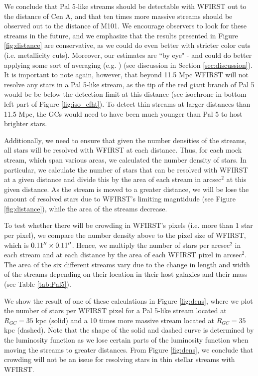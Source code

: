 \documentclass[twocolumn]{aastex62}
\begin{document}
We conclude that Pal 5-like streams should be detectable with WFIRST out to the distance of Cen A, and that ten times more massive streams should be observed out to the distance of M101. We encourage observers to look for these streams in the future, and we emphasize that the results presented in Figure \ref{fig:distance} are conservative, as we could do even better with stricter color cuts (i.e. metallicity cuts). Moreover, our estimates are ``by eye" - and could do better applying some sort of averaging (e.g. \citealt{malhan18}) (see discussion in Section \ref{sec:discussion}). It is important to note again, however, that beyond 11.5 Mpc WFIRST will not resolve any stars in a Pal 5-like stream, as the tip of the red giant branch of Pal 5 would be be below the detection limit at this distance (see isochrone in bottom left part of Figure \ref{fig:iso_cfht}). To detect thin streams at larger distances than 11.5 Mpc, the GCs would need to have been much younger than Pal 5 to host brighter stars. 

Additionally, we need to ensure that given the number densities of the streams, all stars will be resolved with WFIRST at each distance. Thus, for each mock stream, which span various areas, we calculated the number density of stars. In particular, we calculate the number of stars that can be resolved with WFIRST at a given distance and divide this by the area of each stream in arcsec$^2$ at this given distance. As the stream is moved to a greater distance, we will be lose the amount of resolved stars due to WFIRST's limiting magntidude (see Figure \ref{fig:distance}), while the area of the streams decrease. 

To test whether there will be crowding in WFIRST's pixels (i.e. more than 1 star per pixel), we compare the number density above to the pixel size of WFIRST, which is $0.11\mbox{$^{\prime\prime}$} \times 0.11\mbox{$^{\prime\prime}$}$. Hence, we multiply the number of stars per arcsec$^2$ in each stream and at each distance by the area of each WFIRST pixel in arcsec$^2$.
The area of the six different streams vary due to the change in length and width of the streams depending on their location in their host galaxies and their mass (see Table \ref{tab:Pal5}). 

We show the result of one of these calculations in Figure \ref{fig:dens}, where we plot the number of stars per WFIRST pixel for a Pal 5-like stream located at $R_{GC} = 35$ kpc (solid) and a 10 times more massive stream located at $R_{GC} = 35$ kpc (dashed). Note that the shape of the solid and dashed curve is determined by the luminosity function as we lose certain parts of the luminosity function when moving the streams to greater distances. From Figure \ref{fig:dens}, we conclude that crowding will not be an issue for resolving stars in thin stellar streams with WFIRST. 
\end{document}
